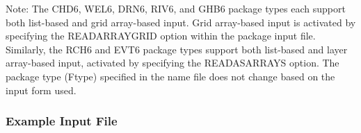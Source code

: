 \noindent Note: The CHD6, WEL6, DRN6, RIV6, and GHB6 package types each support both list-based and grid array-based input.  Grid array-based input is activated by specifying the READARRAYGRID option within the package input file.  Similarly, the RCH6 and EVT6 package types support both list-based and layer array-based input, activated by specifying the READASARRAYS option.  The package type (Ftype) specified in the name file does not change based on the input form used.

\vspace{5mm}
\subsubsection{Example Input File}


